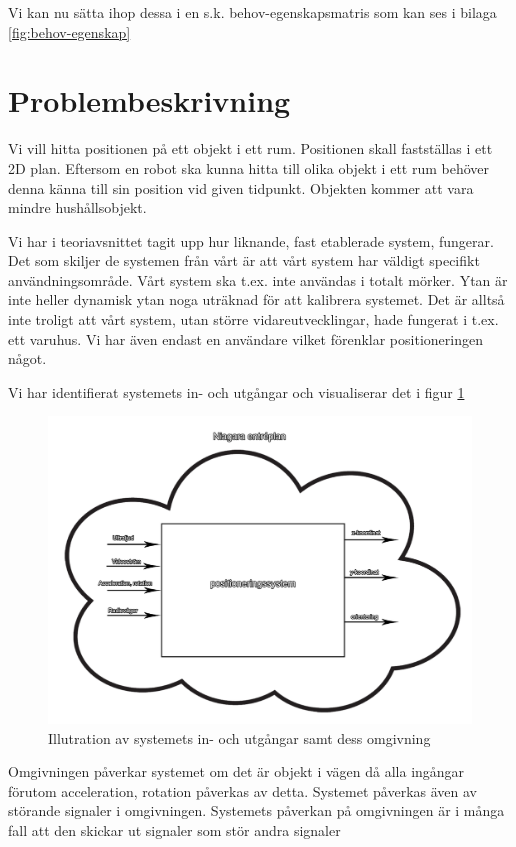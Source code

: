 \documentclass[11pt, a4paper]{report}
\begin{document}
Vi kan nu sätta ihop dessa i en s.k. behov-egenskapsmatris som kan ses i bilaga \ref{fig:behov-egenskap}
\section{Problembeskrivning}
Vi vill hitta positionen på ett objekt i ett rum. Positionen skall fastställas i ett 2D plan. Eftersom en robot ska kunna hitta till olika objekt i ett rum behöver denna känna till sin position vid given tidpunkt. Objekten kommer att vara mindre hushållsobjekt.

Vi har i teoriavsnittet tagit upp hur liknande, fast etablerade system, fungerar. Det som skiljer de systemen från vårt är att vårt system har väldigt specifikt användningsområde. Vårt system ska t.ex. inte användas i totalt mörker. Ytan är inte heller dynamisk ytan noga uträknad för att kalibrera systemet. Det är alltså inte troligt att vårt system, utan större vidareutvecklingar, hade fungerat i t.ex. ett varuhus. Vi har även endast en användare vilket förenklar positioneringen något.

Vi har identifierat systemets in- och utgångar och visualiserar det i figur \ref{fig:system-omgivning}
\begin{figure}[H]
	\begin{center}
		\includegraphics [width=12cm,angle=0]{system-omgivning.png}
		\caption{Illutration av systemets in- och utgångar samt dess omgivning}
		\label{fig:system-omgivning}
	\end{center}
\end{figure}

Omgivningen påverkar systemet om det är objekt i vägen då alla ingångar förutom acceleration, rotation påverkas av detta. Systemet påverkas även av störande signaler i omgivningen. Systemets påverkan på omgivningen är i många fall att den skickar ut signaler som stör andra signaler
\end{document}
